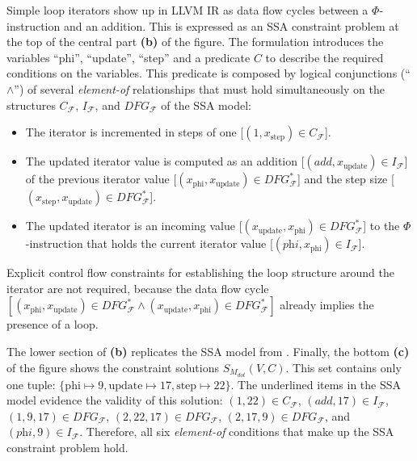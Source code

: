    Simple loop iterators show up in LLVM IR as data flow cycles between a
    $\Phi$-instruction and an addition.
    This is expressed as an SSA constraint problem at the top of the central
    part {\bf(b)} of the figure.
    The formulation introduces the variables
    ``phi'', ``update'', ``step'' and a predicate $C$ to describe the
    required conditions on the variables.
    This predicate is composed by logical conjunctions (``$\land$'') of
    several {\em element-of} relationships that must hold simultaneously on
    the structures $C_\mathcal F$, $I_\mathcal F$, and $DFG_\mathcal F$ of
    the SSA model:
    \begin{itemize}
        \item The iterator is incremented in steps of one
              [$(1,x_\text{step})\in C_\mathcal{F}$].
        \item The updated iterator value is computed as an addition
              [$(\textit{add},x_\text{update})\in I_\mathcal{F}$] of the previous
              iterator value
              [$(x_\text{phi},x_\text{update})\in DFG_\mathcal{F}^*$] and the
              step size
              [$(x_\text{step},x_\text{update})\in DFG_\mathcal{F}^*$].
        \item The updated iterator is an incoming value
              [$(x_\text{update},x_\text{phi})\in DFG_\mathcal{F}^*$] to the
              $\Phi$-instruction that holds the current iterator value
              [$(\textit{phi},x_\text{phi})\in I_\mathcal{F}$].
    \end{itemize}
    Explicit control flow constraints for establishing the loop structure around
    the iterator are not required, because the data flow cycle
    $[(x_\text{phi},x_\text{update})\in DFG_\mathcal{F}^*\mathrel\land(x_\text{update},x_\text{phi})\in DFG_\mathcal{F}^*]$
    already implies the presence of a loop.

    The lower section of  {\bf(b)} replicates the
    SSA model from .
    Finally, the bottom {\bf(c)} of the figure shows the constraint solutions
    $S_{M_{dot}}(V,C)$.
    This set contains only one tuple:
    $\{\text{phi}\mapsto9,\text{update}\mapsto17,\text{step}\mapsto22\}$.
    The underlined items in the SSA model evidence the validity of this
    solution:
    $(1,22)\in C_\mathcal F$,
    $(\textit{add},17)\in I_\mathcal F$,
    $(1,9,17)\in DFG_\mathcal F$,
    $(2,22,17)\in DFG_\mathcal F$,
    $(2,17,9)\in DFG_\mathcal F$, and
    $(\textit{phi},9)\in I_\mathcal F$.
    Therefore, all six {\it element-of} conditions that make up the SSA
    constraint problem hold.

